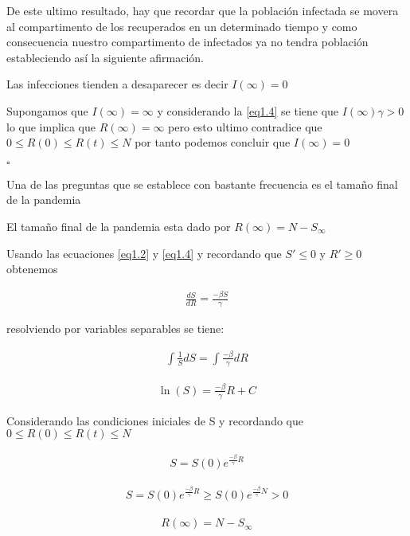 De este ultimo resultado, hay que recordar que la población infectada se movera al compartimento de los recuperados en un determinado tiempo y como consecuencia nuestro compartimento
de infectados ya no tendra población estableciendo así la siguiente afirmación.

\begin{Af}
Las infecciones tienden a desaparecer es decir $I(\infty) = 0$
\end{Af}

\begin{Dem}

Supongamos que $I(\infty) = \infty$ y considerando la \ref{eq1.4} se tiene que $I(\infty) \gamma > 0$ lo que implica que $R(\infty) = \infty$ pero esto ultimo contradice que $0 \leq R(0) \leq R(t) \leq N$  por tanto podemos concluir que $I(\infty) = 0$

\end{Dem}

\hfill	$\square$

Una de las preguntas que se establece con bastante frecuencia es el tamaño final de la pandemia

\begin{Af}
El tamaño final de la pandemia esta dado por $R(\infty) = N - S_{\infty}$
\end{Af}

\begin{Dem}

Usando las ecuaciones \ref{eq1.2} y \ref{eq1.4} y recordando que $S' \leq 0$ y $R' \geq 0$ obtenemos 

\begin{align*}
\frac{dS}{dR} = \frac{-\beta S}{\gamma}
\end{align*}

resolviendo por variables separables se tiene:

\begin{align*}
\int \frac{1}{S} dS = \int \frac{-\beta}{\gamma} dR 
\end{align*}

\begin{align*}
\ln(S) = \frac{-\beta}{\gamma} R + C
\end{align*}

Considerando las condiciones iniciales de S y recordando que $0 \leq R(0) \leq R(t) \leq N$

\begin{align*}
S = S(0) e^{\frac{-\beta}{\gamma}R}
\end{align*}

\begin{align*}
S = S(0) e^{\frac{-\beta}{\gamma}R} \geq S(0) e^{\frac{-\beta}{\gamma}N} > 0
\end{align*}

\begin{align*}
R(\infty) = N - S_{\infty}
\end{align*}

\end{Dem}

